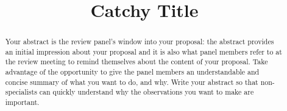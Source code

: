 \documentclass[11pt]{article}
\begin{document}
\title{Catchy Title}



%


\begin{abstract}

Your abstract is the review panel's window into your proposal: the abstract
provides an initial impression about your proposal and it is also
what panel members refer to at the review meeting to remind themselves
about the content of your proposal.  Take advantage of the opportunity
to give the panel members an understandable and concise summary of what 
you want to do, and why.  Write your abstract so that non-specialists can
quickly understand why the observations you want to make are important.

\end{abstract}


\end{document}
